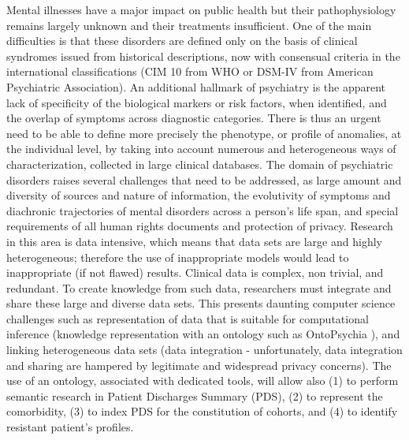 \documentclass[a4paper,UKenglish]{dagrep}
\begin{document}
\license
Mental illnesses have a major impact on public health but their pathophysiology
remains largely unknown and their treatments insufficient. One of the main
difficulties is that these disorders are defined only on the basis of clinical
syndromes issued from historical descriptions, now with consensual criteria in
the international classifications (CIM 10 from WHO or DSM-IV from American
Psychiatric Association). An additional hallmark of psychiatry is the apparent
lack of specificity of the biological markers or risk factors, when identified,
and the overlap of symptoms across diagnostic categories. There is thus an
urgent need to be able to define more precisely the phenotype, or profile of
anomalies, at the individual level, by taking into account numerous and
heterogeneous ways of characterization, collected in large clinical databases.
The domain of psychiatric disorders raises several challenges that need to be
addressed, as large amount and diversity of sources and nature of information,
the evolutivity of symptoms and diachronic trajectories of mental disorders
across a person's life span, and special requirements of all human rights
documents and protection of privacy. Research in this area is data intensive,
which means that data sets are large and highly heterogeneous; therefore the use
of inappropriate models would lead to inappropriate (if not flawed) results.
Clinical data is complex, non trivial, and redundant. To create knowledge from
such data, researchers must integrate and share these large and diverse data
sets. This presents daunting computer science challenges such as representation
of data that is suitable for computational inference (knowledge representation
with an ontology such as OntoPsychia \cite{Richard2015}), and linking
heterogeneous data sets (data integration - unfortunately, data integration and
sharing are hampered by legitimate and widespread privacy concerns). The use of
an ontology, associated with dedicated tools, will allow also (1) to perform
semantic research in Patient Discharges Summary (PDS), (2) to represent the
comorbidity, (3) to index PDS for the constitution of cohorts, and (4) to
identify resistant patient's profiles.
\end{document}
